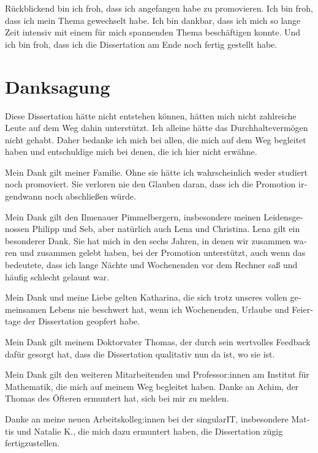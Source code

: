 \begin{otherlanguage}{ngerman}
Rückblickend bin ich froh, dass ich angefangen habe zu promovieren. Ich bin froh, dass ich mein Thema gewechselt habe. Ich bin dankbar, dass ich mich so lange Zeit intensiv mit einem für mich spannenden Thema beschäftigen konnte. Und ich bin froh, dass ich die Dissertation am Ende noch fertig gestellt habe. 

\newpage
\chapter*{Danksagung}
Diese Dissertation hätte nicht entstehen können, hätten mich nicht zahlreiche Leute auf dem Weg dahin unterstützt. Ich alleine hätte das Durchhaltevermögen nicht gehabt. Daher bedanke ich mich bei allen, die mich auf dem Weg begleitet haben und entschuldige mich bei denen, die ich hier nicht erwähne.

Mein Dank gilt meiner Familie. Ohne sie hätte ich wahrscheinlich weder studiert noch promoviert. Sie verloren nie den Glauben daran, dass ich die Promotion irgendwann noch abschließen würde. 

Mein Dank gilt den Ilmenauer Pimmelbergern, insbesondere meinen Leidensgenossen Philipp und Seb, aber natürlich auch Lena und Christina. Lena gilt ein besonderer Dank. Sie hat mich in den sechs Jahren, in denen wir zusammen waren und zusammen gelebt haben, bei der Promotion unterstützt, auch wenn das bedeutete, dass ich lange Nächte und Wochenenden vor dem Rechner saß und häufig schlecht gelaunt war.

Mein Dank und meine Liebe gelten Katharina, die sich trotz unseres vollen gemeinsamen Lebens nie beschwert hat, wenn ich Wochenenden, Urlaube und Feiertage der Dissertation geopfert habe.

Mein Dank gilt meinem Doktorvater Thomas, der durch sein wertvolles Feedback dafür gesorgt hat, dass die Dissertation qualitativ nun da ist, wo sie ist.

Mein Dank gilt den weiteren Mitarbeitenden und Professor:innen am Institut für Mathematik, die mich auf meinem Weg begleitet haben. Danke an Achim, der Thomas des Öfteren ermuntert hat, sich bei mir zu melden. 

Danke an meine neuen Arbeitskolleg:innen bei der singularIT, insbesondere Mattis und Natalie K., die mich dazu ermuntert haben, die Dissertation zügig fertigzustellen.

\end{otherlanguage}
\endgroup